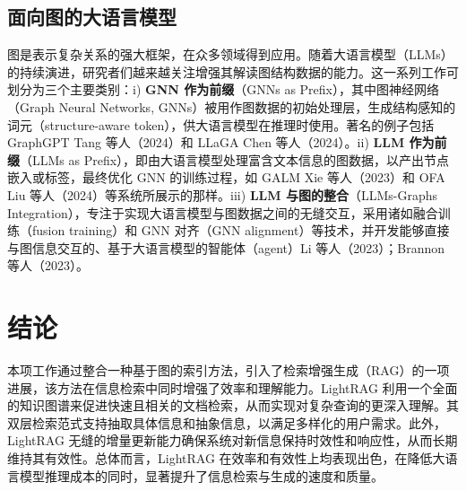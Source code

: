 \documentclass[11pt,UTF8,fontset=fandol]{ctexart}
\begin{document}
\subsection{面向图的大语言模型}

图是表示复杂关系的强大框架，在众多领域得到应用。随着大语言模型（LLMs）的持续演进，研究者们越来越关注增强其解读图结构数据的能力。这一系列工作可划分为三个主要类别：i) \textbf{GNN 作为前缀}（GNNs as Prefix），其中图神经网络（Graph Neural Networks, GNNs）被用作图数据的初始处理层，生成结构感知的词元（structure-aware token），供大语言模型在推理时使用。著名的例子包括 GraphGPT Tang 等人（2024）和 LLaGA Chen 等人（2024）。ii) \textbf{LLM 作为前缀}（LLMs as Prefix），即由大语言模型处理富含文本信息的图数据，以产出节点嵌入或标签，最终优化 GNN 的训练过程，如 GALM Xie 等人（2023）和 OFA Liu 等人（2024）等系统所展示的那样。iii) \textbf{LLM 与图的整合}（LLMs-Graphs Integration），专注于实现大语言模型与图数据之间的无缝交互，采用诸如融合训练（fusion training）和 GNN 对齐（GNN alignment）等技术，并开发能够直接与图信息交互的、基于大语言模型的智能体（agent）Li 等人（2023）；Brannon 等人（2023）。

\section{结论}

本项工作通过整合一种基于图的索引方法，引入了检索增强生成（RAG）的一项进展，该方法在信息检索中同时增强了效率和理解能力。LightRAG 利用一个全面的知识图谱来促进快速且相关的文档检索，从而实现对复杂查询的更深入理解。其双层检索范式支持抽取具体信息和抽象信息，以满足多样化的用户需求。此外，LightRAG 无缝的增量更新能力确保系统对新信息保持时效性和响应性，从而长期维持其有效性。总体而言，LightRAG 在效率和有效性上均表现出色，在降低大语言模型推理成本的同时，显著提升了信息检索与生成的速度和质量。
\end{document}
